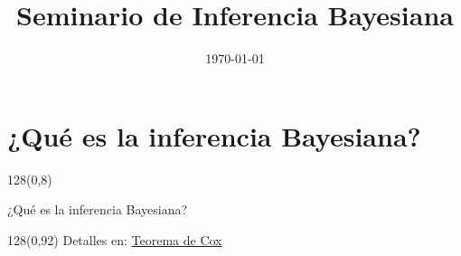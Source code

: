 \documentclass[shownotes]{beamer}
\title[Inferencia Bayesiana]{Seminario de Inferencia Bayesiana}
\institute[Bayes Buenos Aires]{\texttt{[image: ../../aux/static/peligro\_predador]}}
\date{\today}
\begin{document}
\small

\begin{frame}[noframenumbering]
 
\maketitle
 \end{frame}
 
\section{¿Qu\'e es la inferencia Bayesiana?}

\begin{frame}
\begin{textblock}{128}(0,8)
\begin{center}
 \large ¿Qu\'e es la inferencia Bayesiana?
\end{center}
\end{textblock}

\vspace{0.75cm}
\pause


\begin{textblock}{128}(0,92)
\tiny \centering
Detalles en: \href{https://doi.org/10.1016/S0888-613X(03)00051-3}{Teorema de Cox}
\end{textblock}
 \end{frame}
 
 
% 
% 
% 
% 
%  
% 
% 
% 
%  
\end{document}
